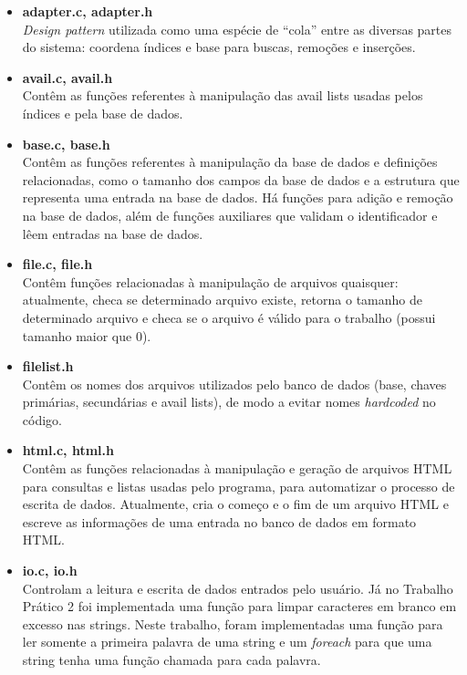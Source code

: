\documentclass{article}
\begin{document}
\begin{itemize}
\item \textbf{adapter.c, adapter.h}\\
	\textit{Design pattern} utilizada como uma espécie de ``cola'' entre as diversas partes do sistema: coordena índices e base para buscas, remoções e inserções.

\item \textbf{avail.c, avail.h}\\
	Contêm as funções referentes à manipulação das avail lists usadas pelos índices e pela base de dados.

\item \textbf{base.c, base.h}\\
	Contêm as funções referentes à manipulação da base de dados e definições relacionadas, como o tamanho dos campos da base de dados e a estrutura que representa uma entrada na base de dados. Há funções para adição e remoção na base de dados, além de funções auxiliares que validam o identificador e lêem entradas na base de dados.

 \item \textbf{file.c, file.h}\\
	Contêm funções relacionadas à manipulação de arquivos quaisquer: atualmente, checa se determinado arquivo existe, retorna o tamanho de determinado arquivo e checa se o arquivo é válido para o trabalho (possui tamanho maior que 0).

\item \textbf{filelist.h}\\
	Contêm os nomes dos arquivos utilizados pelo banco de dados (base, chaves primárias, secundárias e avail lists), de modo a evitar nomes \textit{hardcoded} no código.

 \item \textbf{html.c, html.h}\\
	Contêm as funções relacionadas à manipulação e geração de arquivos HTML para consultas e listas usadas pelo programa, para automatizar o processo de escrita de dados. Atualmente, cria o começo e o fim de um arquivo HTML e escreve as informações de uma entrada no banco de dados em formato HTML.

 \item \textbf{io.c, io.h}\\
	Controlam a leitura e escrita de dados entrados pelo usuário. Já no Trabalho Prático 2 foi implementada uma função para limpar caracteres em branco em excesso nas strings. Neste trabalho, foram implementadas uma função para ler somente a primeira palavra de uma string e um \textit{foreach} para que uma string tenha uma função chamada para cada palavra.


\end{itemize}
\end{document}
